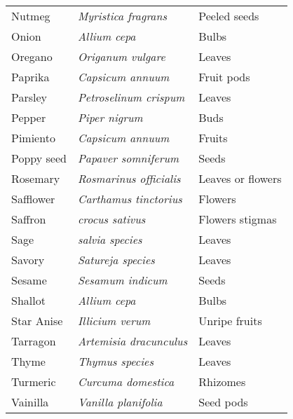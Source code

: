 {\begin{tabular}{|l| >{\em} l|l|}
Nutmeg & Myristica fragrans & Peeled seeds \\ 
Onion & Allium cepa & Bulbs \\ 
Oregano & Origanum vulgare & Leaves \\ 
Paprika & Capsicum annuum & Fruit pods \\ 
Parsley & Petroselinum crispum & Leaves \\ 
Pepper & Piper nigrum & Buds \\ 
Pimiento & Capsicum annuum & Fruits \\ 
Poppy seed & Papaver somniferum & Seeds \\ 
Rosemary & Rosmarinus officialis & Leaves or flowers \\ 
Safflower & Carthamus tinctorius & Flowers \\ 
Saffron & crocus sativus & Flowers stigmas \\ 
Sage & salvia species & Leaves \\ 
Savory & Satureja species & Leaves \\ 
Sesame & Sesamum indicum & Seeds \\ 
Shallot & Allium cepa & Bulbs \\ 
Star Anise & Illicium verum & Unripe fruits \\ 
Tarragon & Artemisia dracunculus & Leaves \\ 
Thyme & Thymus species & Leaves \\ 
Turmeric & Curcuma domestica & Rhizomes \\ 
Vainilla & Vanilla planifolia & Seed pods \\ 
\hline
\end{tabular}
}

